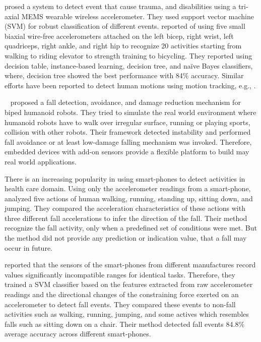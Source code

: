 \documentclass{IEEEtran}
\begin{document}
\cite{leoneFallDetection2013} prosed a system to detect event that cause trauma, and disabilities
using a tri-axial MEMS wearable wireless accelerometer. They used support vector machine (SVM) for
robust classification of different events. \cite{BaoActivityrecognition2004} reported of using five 
small biaxial wire-free accelerometers attached  on the left bicep, right wrist, left quadriceps, 
right ankle, and right hip to recognize 20 activities starting from  walking  to  riding elevator  
to  strength  training to bicycling. They reported using decision table, instance-based learning, 
decision tree, and na\"{i}ve Bayes classifiers, where, decision tree showed the best performance 
with 84\% accuracy.  Similar efforts have been reported to detect human motions using motion 
tracking, e.g., 
\cite{dumitracheFallDetection2013,kumarActivitAndFallDetection2013,krishnanActivityRecognition2014,gaoActivityRecognition2014,alvarezActivityAndFallRecognotion2015}.
 


{~\cite{moyaFallAndDamageDetection2015}} proposed a fall detection, avoidance, and damage 
reduction mechanism for biped humanoid robots. They tried to simulate the real world environment 
where humanoid robots have to walk over irregular surface, running or playing sports, collision 
with other robots. Their framework detected instability and performed fall avoidance or at 
least low-damage falling mechanism was invoked. Therefore, embedded devices  with add-on sensors 
provide a flexible platform to build may real world applications. 


There is an increasing popularity in using smart-phones to detect activities in health care domain. 
Using only the accelerometer readings from a smart-phone, \cite{baiFallDetectionPhone2013} analyzed five 
actions of human walking, running, standing up, sitting down, and jumping. They compared the 
acceleration characteristics of these actions with three different fall accelerations to infer the 
direction of the fall. Their method recognize the fall activity, only when a predefined set of 
conditions were met. But the method did not provide any prediction or indication value, that a fall 
may occur in future. 

\cite{steidlFallDetection2012} reported that the sensors of the smart-phones from different manufactures 
record values significantly incompatible ranges for identical tasks. Therefore, they trained a SVM 
classifier based on the features extracted from raw accelerometer readings and the directional 
changes of the constraining force exerted on an accelerometer to detect fall events. They compared 
these events to non-fall activities such as walking, running, jumping, and some actives which 
resembles falls such as sitting down on a chair. Their method detected fall events 84.8\% average 
accuracy across different smart-phones. 
\end{document}
